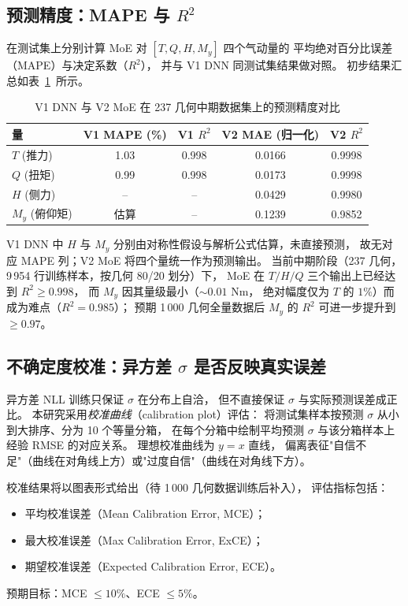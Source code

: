 \subsection{预测精度：MAPE 与 \texorpdfstring{$R^2$}{R2}}

在测试集上分别计算 MoE 对 $[T, Q, H, M_y]$ 四个气动量的
平均绝对百分比误差（MAPE）与决定系数（$R^2$），
并与 V1 DNN 同测试集结果做对照。
初步结果汇总如表~\ref{tab:moe_mape}~所示。

\begin{table}[htbp]
\centering
\caption{V1 DNN 与 V2 MoE 在 237 几何中期数据集上的预测精度对比}
\label{tab:moe_mape}
\begin{tabular}{lcccc}
\toprule
\textbf{量} & \textbf{V1 MAPE (\%)} & \textbf{V1 $R^2$} & \textbf{V2 MAE (归一化)} & \textbf{V2 $R^2$} \\
\midrule
$T$ (推力)   & 1.03 & 0.998 & 0.0166 & 0.9998 \\
$Q$ (扭矩)   & 0.99 & 0.998 & 0.0173 & 0.9998 \\
$H$ (侧力)   & --   & --    & 0.0429 & 0.9980 \\
$M_y$ (俯仰矩) & 估算 & --   & 0.1239 & 0.9852 \\
\bottomrule
\end{tabular}
\end{table}

V1 DNN 中 $H$ 与 $M_y$ 分别由对称性假设与解析公式估算，未直接预测，
故无对应 MAPE 列；V2 MoE 将四个量统一作为预测输出。
当前中期阶段（237 几何，9\,954 行训练样本，按几何 80/20 划分）下，
MoE 在 $T / H / Q$ 三个输出上已经达到 $R^2 \geq 0.998$，
而 $M_y$ 因其量级最小（$\sim 0.01$ Nm，
绝对幅度仅为 $T$ 的 $1\%$）而成为难点（$R^2 = 0.985$）；
预期 1\,000 几何全量数据后 $M_y$ 的 $R^2$ 可进一步提升到 $\geq 0.97$。

\subsection{不确定度校准：异方差 \texorpdfstring{$\sigma$}{sigma} 是否反映真实误差}

异方差 NLL 训练只保证 $\sigma$ 在分布上自洽，
但不直接保证 $\sigma$ 与实际预测误差成正比。
本研究采用\emph{校准曲线}（calibration plot）评估：
将测试集样本按预测 $\sigma$ 从小到大排序、分为 10 个等量分箱，
在每个分箱中绘制平均预测 $\sigma$ 与该分箱样本上经验 RMSE 的对应关系。
理想校准曲线为 $y = x$ 直线，
偏离表征"自信不足"（曲线在对角线上方）或"过度自信"（曲线在对角线下方）。

校准结果将以图表形式给出（待 1\,000 几何数据训练后补入），
评估指标包括：
\begin{itemize}
  \item 平均校准误差（Mean Calibration Error, MCE）；
  \item 最大校准误差（Max Calibration Error, ExCE）；
  \item 期望校准误差（Expected Calibration Error, ECE）。
\end{itemize}
预期目标：MCE $\leq 10\%$、ECE $\leq 5\%$。

